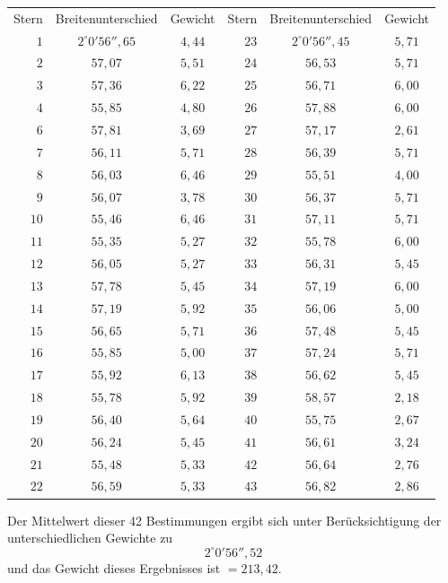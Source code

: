\begin{center}
{\small\setlength{\tabcolsep}{7pt}\renewcommand{\arraystretch}{1.05}
\begin{tabular}{r|c|c||r|c|c}
Stern& Breitenunterschied& Gewicht& Stern& Breitenunterschied& Gewicht\\
\cline{1-3}\cline{4-6}
$1$&$2^\circ0'56''{,}65$&$4{,}44$&$23$&$2^\circ0'56''{,}45$&$5{,}71$\\
$2$&$57{,}07$&$5{,}51$&$24$&$56{,}53$&$5{,}71$\\
$3$&$57{,}36$&$6{,}22$&$25$&$56{,}71$&$6{,}00$\\
$4$&$55{,}85$&$4{,}80$&$26$&$57{,}88$&$6{,}00$\\
$6$&$57{,}81$&$3{,}69$&$27$&$57{,}17$&$2{,}61$\\
$7$&$56{,}11$&$5{,}71$&$28$&$56{,}39$&$5{,}71$\\
$8$&$56{,}03$&$6{,}46$&$29$&$55{,}51$&$4{,}00$\\
$9$&$56{,}07$&$3{,}78$&$30$&$56{,}37$&$5{,}71$\\
$10$&$55{,}46$&$6{,}46$&$31$&$57{,}11$&$5{,}71$\\
$11$&$55{,}35$&$5{,}27$&$32$&$55{,}78$&$6{,}00$\\
$12$&$56{,}05$&$5{,}27$&$33$&$56{,}31$&$5{,}45$\\
$13$&$57{,}78$&$5{,}45$&$34$&$57{,}19$&$6{,}00$\\
$14$&$57{,}19$&$5{,}92$&$35$&$56{,}06$&$5{,}00$\\
$15$&$56{,}65$&$5{,}71$&$36$&$57{,}48$&$5{,}45$\\
$16$&$55{,}85$&$5{,}00$&$37$&$57{,}24$&$5{,}71$\\
$17$&$55{,}92$&$6{,}13$&$38$&$56{,}62$&$5{,}45$\\
$18$&$55{,}78$&$5{,}92$&$39$&$58{,}57$&$2{,}18$\\
$19$&$56{,}40$&$5{,}64$&$40$&$55{,}75$&$2{,}67$\\
$20$&$56{,}24$&$5{,}45$&$41$&$56{,}61$&$3{,}24$\\
$21$&$55{,}48$&$5{,}33$&$42$&$56{,}64$&$2{,}76$\\
$22$&$56{,}59$&$5{,}33$&$43$&$56{,}82$&$2{,}86$\\
\end{tabular}}
\end{center}

Der Mittelwert dieser 42 Bestimmungen ergibt sich unter Berücksichtigung
der unterschiedlichen Gewichte zu
\[
2^\circ0'56''{,}52
\]
und das Gewicht dieses Ergebnisses ist $=213{,}42$.

